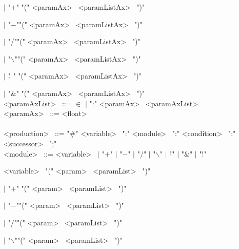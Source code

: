 \hspace{1cm} $|$ "$+$" "("  \textless paramAx\textgreater~ \textless paramListAx\textgreater~ ")" 

\hspace{1cm} $|$ "$-$""("  \textless paramAx\textgreater~ \textless paramListAx\textgreater~ ")" 

\hspace{1cm} $|$ "/""("  \textless paramAx\textgreater~ \textless paramListAx\textgreater~ ")" 

\hspace{1cm} $|$ "$\backslash$""("  \textless paramAx\textgreater~ \textless paramListAx\textgreater~ ")" 

\hspace{1cm} $|$ "$\hat{}$ " "("  \textless paramAx\textgreater~ \textless paramListAx\textgreater~ ")" 

\hspace{1cm} $|$ "$\&$" "("  \textless paramAx\textgreater~ \textless paramListAx\textgreater~ ")" \\
\textless paramAxList\textgreater~ ::=  $\in$ $|$ ":" \textless paramAx\textgreater~ \textless paramAxList\textgreater~ \\
\textless paramAx\textgreater~ ::= \textless float\textgreater~ \\
\\
\textless production\textgreater~ ::=  "\#" \textless variable\textgreater~  ":" \textless module\textgreater~ ":" \textless condition\textgreater~  ":" \textless successor\textgreater~ ";"\\
\textless module\textgreater~ ::=  \textless variable\textgreater~ $|$ "$+$" $|$ "$-$" $|$ "/" $|$ "$\backslash$" $|$ "$\hat{}$" $|$ "$\&$" $|$ "!" 

\hspace{1cm} \textless variable\textgreater~ "("  \textless param\textgreater~ \textless paramList\textgreater~ ")"

\hspace{1cm} $|$ "$+$" "("  \textless param\textgreater~ \textless paramList\textgreater~ ")" 

\hspace{1cm} $|$ "$-$""("  \textless param\textgreater~ \textless paramList\textgreater~ ")" 

\hspace{1cm} $|$ "/""("  \textless param\textgreater~ \textless paramList\textgreater~ ")" 

\hspace{1cm} $|$ "$\backslash$""("  \textless param\textgreater~ \textless paramList\textgreater~ ")" 

